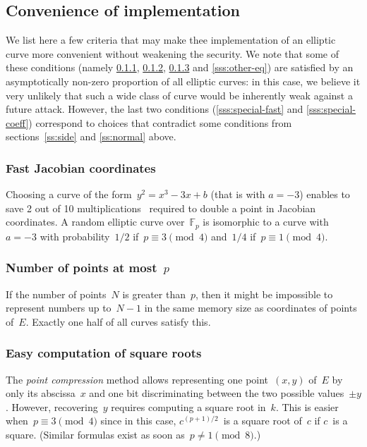 \documentclass[twocolumn,letterpaper,10pt]{article}
\def\F{\mathbb{F}}
\begin{document}
\subsection{Convenience of implementation}
\label{ss:convenience}

We list here a few criteria that
may make thee implementation of
an elliptic curve more convenient
without weakening the security.
We note that some of these conditions
(namely \ref{sss:a=-3}, \ref{sss:few-points},
\ref{sss:easy-sqrt} and \ref{sss:other-eq}) are satisfied
by an asymptotically non-zero proportion of all elliptic curves:
in this case, we believe it very unlikely
that such a wide class of curve would be inherently weak
against a future attack.
However, the last two conditions (\ref{sss:special-fast} and
\ref{sss:special-coeff}) correspond to choices that
contradict some conditions from sections~\ref{ss:side}
and \ref{ss:normal} above.

\subsubsection{Fast Jacobian coordinates}
\label{sss:a=-3}

Choosing a curve of the form~$y^2 = x^3 - 3 x + b$ (that is with $a=-3$)
enables to save 2 out of 10 multiplications~\cite{ieeep1363}
required to double a point in Jacobian coordinates.
A random elliptic curve over~$\F_p$
is isomorphic to a curve with~$a = -3$
with probability~$1/2$ if~$p ≡ 3 \pmod{4}$ and~$1/4$ if~$p ≡ 1 \pmod{4}$.

\subsubsection{Number of points at most~\texorpdfstring{$p$}{p}}
\label{sss:few-points}

If the number of points~$N$ is greater than~$p$,
then it might be impossible to represent numbers up to~$N-1$
in the same memory size as coordinates of points of~$E$.
Exactly one half of all curves satisfy this.

\subsubsection{Easy computation of square roots}
\label{sss:easy-sqrt}

The \emph{point compression} method allows representing
one point~$(x,y)$ of~$E$ by only its abscissa~$x$ and
one bit discriminating between the two possible values~$±y$.
However, recovering~$y$ requires computing a square root in~$k$.
This is easier when~$p ≡ 3 \pmod{4}$ since
in this case, $c^{(p+1)/2}$~is a square root of~$c$ if $c$~is a square.
(Similar formulas exist as soon as~$p \neq 1 \pmod{8}$.)
\end{document}
